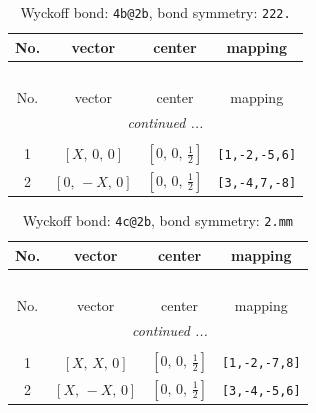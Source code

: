 \documentclass[fleqn,8pt]{jsarticle}
\begin{document}
\renewcommand{\arraystretch}{1.2}
\begin{longtable}{cccc}
\caption{Wyckoff bond: {\tt 4b@2b}, bond symmetry: {\tt 222.}}
 \\
 \hline \hline
No. & vector & center & mapping \\ \hline \endfirsthead

\multicolumn{3}{l}{\tablename\ \thetable{}} \\
 \hline \hline
No. & vector & center & mapping \\ \hline \endhead

 \hline \hline
\multicolumn{3}{r}{\footnotesize\it continued ...} \\ \endfoot

 \hline \hline
\multicolumn{3}{r}{} \\ \endlastfoot

1 & $\left[ X,\, 0,\, 0 \right]$ & $\left[ 0,\, 0,\, \frac{1}{2} \right]$ & {\tt [1,-2,-5,6]} \\ \hline
2 & $\left[ 0,\, - X,\, 0 \right]$ & $\left[ 0,\, 0,\, \frac{1}{2} \right]$ & {\tt [3,-4,7,-8]} \\
\end{longtable}
\renewcommand{\arraystretch}{1.2}
\begin{longtable}{cccc}
\caption{Wyckoff bond: {\tt 4c@2b}, bond symmetry: {\tt 2.mm}}
 \\
 \hline \hline
No. & vector & center & mapping \\ \hline \endfirsthead

\multicolumn{3}{l}{\tablename\ \thetable{}} \\
 \hline \hline
No. & vector & center & mapping \\ \hline \endhead

 \hline \hline
\multicolumn{3}{r}{\footnotesize\it continued ...} \\ \endfoot

 \hline \hline
\multicolumn{3}{r}{} \\ \endlastfoot

1 & $\left[ X,\, X,\, 0 \right]$ & $\left[ 0,\, 0,\, \frac{1}{2} \right]$ & {\tt [1,-2,-7,8]} \\ \hline
2 & $\left[ X,\, - X,\, 0 \right]$ & $\left[ 0,\, 0,\, \frac{1}{2} \right]$ & {\tt [3,-4,-5,6]} \\
\end{longtable}
\renewcommand{\arraystretch}{1.2}
\end{document}
